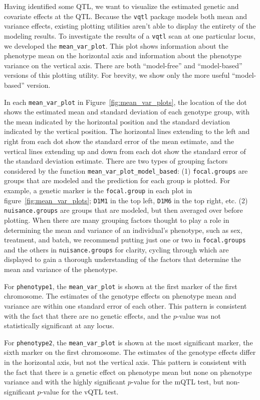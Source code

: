 \documentclass{article}
\begin{document}
Having identified some QTL, we want to visualize the estimated genetic and covariate effects at the QTL.
Because the \texttt{vqtl} package models both mean and variance effects, existing plotting utilities aren't able to display the entirety of the modeling results.
To investigate the results of a \texttt{vqtl} scan at one particular locus, we developed the \texttt{mean\_var\_plot}.
This plot shows information about the phenotype mean on the horizontal axis and information about the phenotype variance on the vertical axis.
There are both ``model-free'' and ``model-based'' versions of this plotting utility.
For brevity, we show only the more useful ``model-based'' version.

In each \texttt{mean\_var\_plot} in Figure~\ref{fig:mean_var_plots}, the location of the dot shows the estimated mean and standard deviation of each genotype group, with the mean indicated by the horizontal position and the standard deviation indicated by the vertical position.
The horizontal lines extending to the left and right from each dot show the standard error of the mean estimate, and the vertical lines extending up and down from each dot show the standard error of the standard deviation estimate.
There are two types of grouping factors considered by the function \texttt{mean\_var\_plot\_model\_based}:
(1) \texttt{focal.groups} are groups that are modeled and the prediction for each group is plotted.
For example, a genetic marker is the \texttt{focal.group} in each plot in figure~\ref{fig:mean_var_plots}; \texttt{D1M1} in the top left, \texttt{D1M6} in the top right, etc.
(2) \texttt{nuisance.groups} are groups that are modeled, but then averaged over before plotting.
When there are many grouping factors thought to play a role in determining the mean and variance of an individual's phenotype, such as sex, treatment, and batch, we recommend putting just one or two in \texttt{focal.groups} and the others in \texttt{nuisance.groups} for clarity, cycling through which are displayed to gain a thorough understanding of the factors that determine the mean and variance of the phenotype.

For \texttt{phenotype1}, the \texttt{mean\_var\_plot} is shown at the first marker of the first chromosome.
The estimates of the genotype effects on phenotype mean and variance are within one standard error of each other.
This pattern is consistent with the fact that there are no genetic effects, and the $p$-value was not statistically significant at any locus.

For \texttt{phenotype2}, the \texttt{mean\_var\_plot} is shown at the most significant marker, the sixth marker on the first chromosome.
The estimates of the genotype effects differ in the horizontal axis, but not the vertical axis.
This pattern is consistent with the fact that there is a genetic effect on phenotype mean but none on phenotype variance and with the highly significant $p$-value for the mQTL test, but non-significant $p$-value for the vQTL test.
\end{document}
